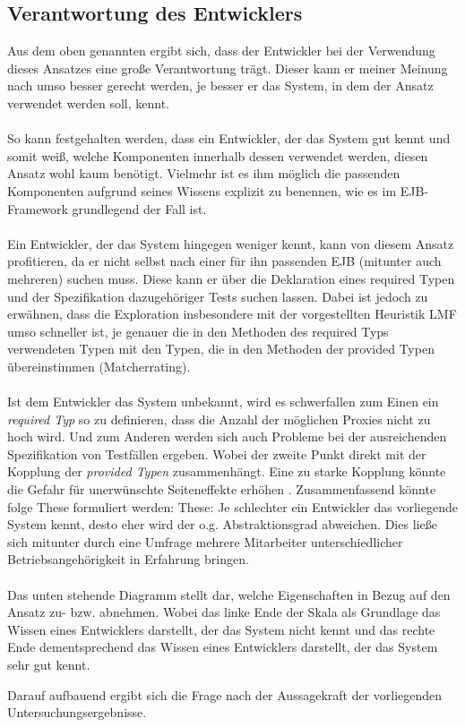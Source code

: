 \subsection{Verantwortung des Entwicklers}
Aus dem oben genannten ergibt sich, dass der Entwickler bei der Verwendung dieses Ansatzes eine große Verantwortung trägt. Dieser kann er meiner Meinung nach umso besser gerecht werden, je besser er das System, in dem der Ansatz verwendet werden soll, kennt. 
\\\\
So kann festgehalten werden, dass ein Entwickler, der das System gut kennt und somit weiß, welche Komponenten innerhalb dessen verwendet werden, diesen Ansatz wohl kaum benötigt. Vielmehr ist es ihm möglich die passenden Komponenten aufgrund seines Wissens explizit zu benennen, wie es im EJB-Framework grundlegend der Fall ist.
\\\\
Ein Entwickler, der das System hingegen weniger kennt, kann von diesem Ansatz profitieren, da er nicht selbst nach einer für ihn passenden EJB (mitunter auch mehreren) suchen muss. Diese kann er über die Deklaration eines required Typen und der Spezifikation dazugehöriger Tests suchen lassen. Dabei ist jedoch zu erwähnen, dass die Exploration insbesondere mit der vorgestellten Heuristik LMF umso schneller ist, je genauer die in den Methoden des required Typs verwendeten Typen mit den Typen, die in den Methoden der provided Typen übereinstimmen (Matcherrating).
\\\\
Ist dem Entwickler das System unbekannt, wird es schwerfallen zum Einen ein \emph{required Typ} so zu definieren, dass die Anzahl der möglichen Proxies nicht zu hoch wird. Und zum Anderen werden sich auch Probleme bei der ausreichenden Spezifikation von Testfällen ergeben. Wobei der zweite Punkt direkt mit der Kopplung der \emph{provided Typen} zusammenhängt. Eine zu starke Kopplung könnte die Gefahr für unerwünschte Seiteneffekte erhöhen \cite{}. Zusammenfassend könnte folge These formuliert werden: These: Je schlechter ein Entwickler das vorliegende System kennt, desto eher wird der o.g. Abstraktionsgrad abweichen. Dies ließe sich mitunter durch eine Umfrage mehrere Mitarbeiter unterschiedlicher Betriebsangehörigkeit in Erfahrung bringen.
\\\\



Das unten stehende Diagramm stellt dar, welche Eigenschaften in Bezug auf den Ansatz zu- bzw. abnehmen. Wobei das linke Ende der Skala als Grundlage das Wissen eines Entwicklers darstellt, der das System nicht kennt und das rechte Ende dementsprechend das Wissen eines Entwicklers darstellt, der das System sehr gut kennt.


Darauf aufbauend ergibt sich die Frage nach der Aussagekraft der vorliegenden Untersuchungsergebnisse.